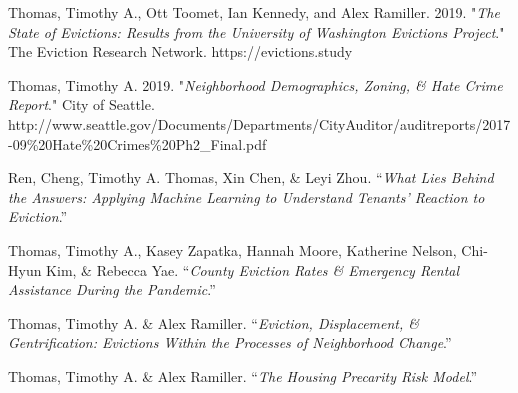 \begin{cvparagraph}

Thomas, Timothy A., Ott Toomet, Ian Kennedy, and Alex Ramiller. 2019. "\emph{The State of Evictions: Results from the University of Washington Evictions Project}." The Eviction Research Network. https://evictions.study
\end{cvparagraph}

\begin{cvparagraph}

Thomas, Timothy A. 2019. "\emph{Neighborhood Demographics, Zoning, \& Hate Crime Report}." City of Seattle.\\
http://www.seattle.gov/Documents/Departments/CityAuditor/auditreports/2017-09\%20Hate\%20Crimes\%20Ph2\_Final.pdf
\end{cvparagraph}

\begin{cvparagraph}


Ren, Cheng, Timothy A. Thomas, Xin Chen, \& Leyi Zhou. “\emph{What Lies Behind the Answers: Applying Machine Learning to Understand Tenants’ Reaction to Eviction}.”

\end{cvparagraph}

\begin{cvparagraph}


Thomas, Timothy A., Kasey Zapatka, Hannah Moore, Katherine Nelson, Chi-Hyun Kim, \& Rebecca Yae. “\emph{County Eviction Rates \& Emergency Rental Assistance During the Pandemic}.”

\end{cvparagraph}


\begin{cvparagraph}

Thomas, Timothy A. \& Alex Ramiller. “\emph{Eviction, Displacement, \& Gentrification: Evictions Within the Processes of Neighborhood Change}.”
\end{cvparagraph}

\begin{cvparagraph}


Thomas, Timothy A. \& Alex Ramiller. “\emph{The Housing Precarity Risk Model}.”

\end{cvparagraph}